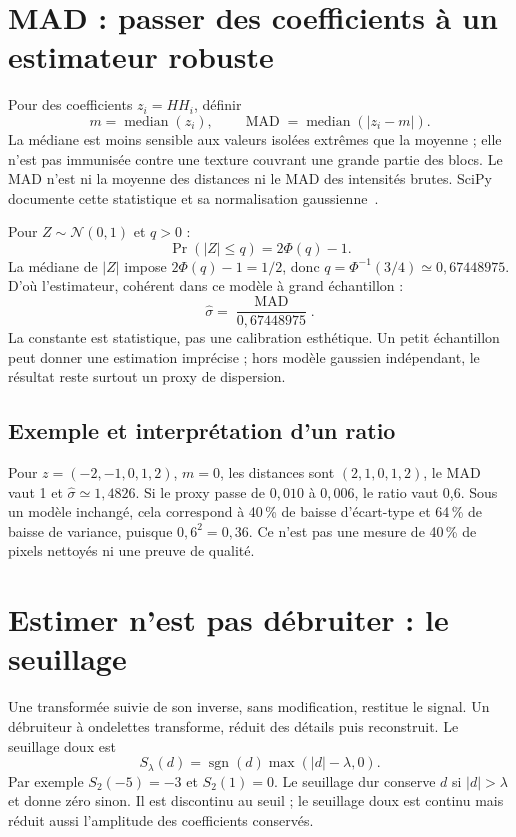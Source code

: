 \section{MAD : passer des coefficients à un estimateur robuste}
Pour des coefficients $z_i=HH_i$, définir
\begin{equation}
m=\operatorname{median}(z_i),\qquad
\operatorname{MAD}=\operatorname{median}(|z_i-m|).
\end{equation}
La médiane est moins sensible aux valeurs isolées extrêmes que la moyenne ;
elle n'est pas immunisée contre une texture couvrant une grande partie des blocs.
Le MAD n'est ni la moyenne des distances ni le MAD des intensités brutes.
SciPy documente cette statistique et sa normalisation gaussienne~\cite{scipyMad}.

Pour $Z\sim\mathcal N(0,1)$ et $q>0$ :
\begin{equation}
\Pr(|Z|\le q)=2\Phi(q)-1.
\end{equation}
La médiane de $|Z|$ impose $2\Phi(q)-1=1/2$, donc
$q=\Phi^{-1}(3/4)\simeq0{,}67448975$.
D'où l'estimateur, cohérent dans ce modèle à grand échantillon :
\begin{equation}\label{eq:mad}
\widehat\sigma=\frac{\operatorname{MAD}}{0{,}67448975}.
\end{equation}
La constante est statistique, pas une calibration esthétique.
Un petit échantillon peut donner une estimation imprécise ; hors modèle
gaussien indépendant, le résultat reste surtout un proxy de dispersion.

\subsection{Exemple et interprétation d'un ratio}
Pour $z=(-2,-1,0,1,2)$, $m=0$, les distances sont $(2,1,0,1,2)$,
le MAD vaut 1 et $\widehat\sigma\simeq1{,}4826$.
Si le proxy passe de $0{,}010$ à $0{,}006$, le ratio vaut 0,6.
Sous un modèle inchangé, cela correspond à 40\,\% de baisse d'écart-type
et 64\,\% de baisse de variance, puisque $0{,}6^2=0{,}36$.
Ce n'est pas une mesure de 40\,\% de pixels nettoyés ni une preuve de qualité.

\section{Estimer n'est pas débruiter : le seuillage}
Une transformée suivie de son inverse, sans modification, restitue le signal.
Un débruiteur à ondelettes transforme, réduit des détails puis reconstruit.
Le seuillage doux est
\begin{equation}
S_\lambda(d)=\operatorname{sgn}(d)\max(|d|-\lambda,0).
\end{equation}
Par exemple $S_2(-5)=-3$ et $S_2(1)=0$.
Le seuillage dur conserve $d$ si $|d|>\lambda$ et donne zéro sinon.
Il est discontinu au seuil ; le seuillage doux est continu mais réduit
aussi l'amplitude des coefficients conservés.

